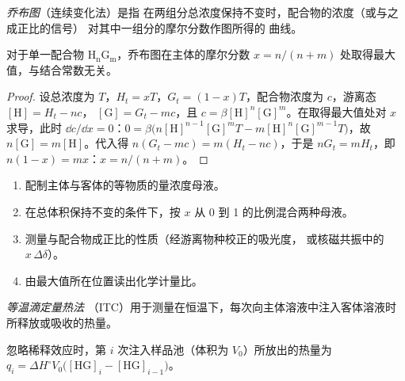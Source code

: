 \begin{definition}[乔布图]\label{def:b3:supramolecular:job}
\emph{乔布图}（连续变化法）是指
在两组分总浓度保持不变时，配合物的浓度（或与之成正比的信号）
对其中一组分的摩尔分数作图所得的
曲线。
\end{definition}

\begin{proposition}[乔布图的最大值]\label{prop:b3:supramolecular:job}
对于单一配合物 $\mathrm{H_nG_m}$，乔布图在主体的摩尔分数
$x = n/(n + m)$ 处取得最大值，与结合常数无关。
\end{proposition}

\begin{proof}
设总浓度为 $T$，$H_t = xT$，$G_t = (1 - x)T$，配合物浓度为 $c$，游离态 $[\mathrm H] = H_t - nc$，
$[\mathrm G] = G_t - mc$，且 $c = \beta[\mathrm H]^n[\mathrm G]^m$。在取得最大值处对 $x$ 求导，此时
$\dd c/\dd x = 0$：$0 = \beta\bigl(n[\mathrm H]^{n-1}[\mathrm G]^m T - m[\mathrm H]^n[\mathrm G]^{m-1}T\bigr)$，故 $n[\mathrm G] = m[\mathrm H]$。代入得
$n(G_t - mc) = m(H_t - nc)$，于是 $nG_t = mH_t$，即 $n(1 - x) = mx$：$x = n/(n + m)$。
\end{proof}

\begin{method}[乔布图的测定]\label{met:b3:supramolecular:job}
\begin{enumerate}
  \item 配制主体与客体的等物质的量浓度母液。
  \item 在总体积保持不变的条件下，按 $x$ 从 0 到 1 的比例混合两种母液。
  \item 测量与配合物成正比的性质（经游离物种校正的吸光度，
        或核磁共振中的 $x\,\Delta\delta$）。
  \item 由最大值所在位置读出化学计量比。
\end{enumerate}
\end{method}

\begin{definition}[等温滴定量热法]\label{def:b3:supramolecular:itc}
\emph{等温滴定量热法}
（ITC）用于测量在恒温下，每次向主体溶液中注入客体溶液时
所释放或吸收的热量。
\end{definition}

\begin{proposition}[每次注入的热量]\label{prop:b3:supramolecular:itc}
忽略稀释效应时，第 $i$ 次注入样品池（体积为 $V_0$）所放出的热量为
$q_i = \Delta H^\circ V_0\bigl([\mathrm{HG}]_i - [\mathrm{HG}]_{i-1}\bigr)$。
\end{proposition}

